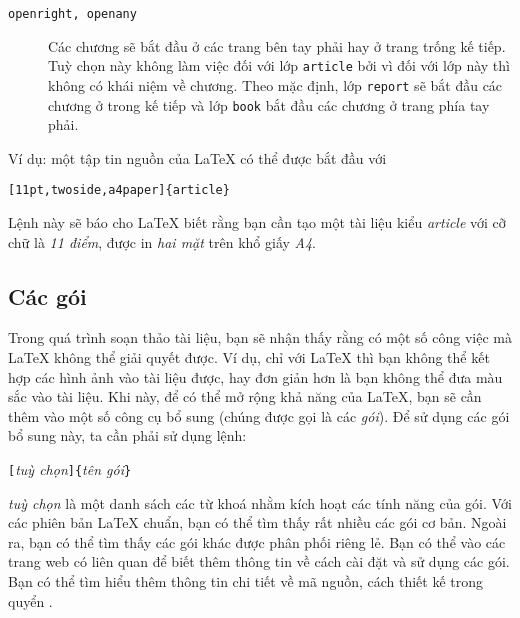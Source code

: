 \begin{table}[!bp]
\begin{lined}{13cm}
\begin{flushleft}
\begin{description}
\item[\normalfont\texttt{openright, openany}] \quad Các chương sẽ bắt đầu ở các trang bên tay phải hay ở trang trống kế tiếp. Tuỳ chọn này không làm việc đối với lớp \texttt{article} bởi vì đối với lớp này thì không có khái niệm về chương. Theo mặc định, lớp \texttt{report} sẽ bắt đầu các chương ở trong kế tiếp và lớp
\texttt{book} bắt đầu các chương ở trang phía tay phải.
\end{description}
\end{flushleft}
\end{lined}
\end{table}

Ví dụ: một tập tin nguồn của \LaTeX{} có thể được bắt đầu với
\begin{code}
\verb|[11pt,twoside,a4paper]{article}|
\end{code}

Lệnh này sẽ báo cho \LaTeX{} biết rằng bạn cần tạo một tài liệu kiểu \emph{article}
với cỡ chữ là \emph{11 điểm}, được in \emph{hai mặt} trên khổ giấy \emph{A4}.

\subsection{Các gói}  
Trong quá trình soạn thảo tài liệu, bạn sẽ nhận thấy rằng có một số công việc mà \LaTeX{} không thể giải quyết được. Ví dụ, chỉ với \LaTeX{} thì bạn không thể kết hợp các hình ảnh vào tài liệu được, hay đơn giản hơn là bạn không thể đưa màu sắc vào tài liệu. Khi này, để có thể mở rộng khả năng của \LaTeX{}, bạn sẽ cần thêm vào một số công cụ bổ sung (chúng được gọi là các \emph{gói}). Để sử dụng các gói bổ sung này, ta cần phải sử dụng lệnh:
\begin{lscommand}
\verb|[|\emph{tuỳ %
chọn}\verb|]{|\emph{tên gói}\verb|}|
\end{lscommand}
\noindent \emph{ tuỳ chọn} là một danh sách các từ khoá nhằm kích hoạt các tính năng của gói. Với các phiên bản \LaTeX{} chuẩn, bạn có thể tìm thấy rất nhiều các gói cơ bản. Ngoài ra, bạn có thể tìm thấy các gói khác được phân phối
riêng lẻ. Bạn có thể vào các trang web có liên quan để biết thêm thông tin về cách cài đặt và sử dụng các gói. Bạn có thể tìm hiểu thêm thông tin chi tiết về mã nguồn, cách thiết kế trong quyển \companion.

